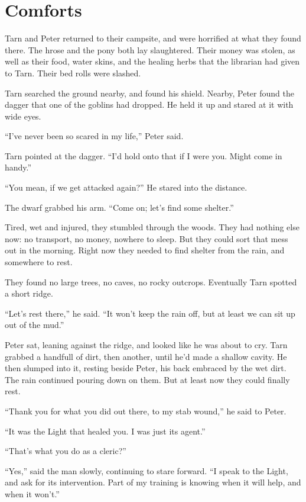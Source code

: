 \chapter{Comforts}

Tarn and Peter returned to their campsite, and were horrified at what they found there.  The hrose and the pony both lay slaughtered.  Their money was stolen, as well as their food, water skins, and the healing herbs that the librarian had given to Tarn.  Their bed rolls were slashed.

Tarn searched the ground nearby, and found his shield.  Nearby, Peter found the dagger that one of the goblins had dropped.  He held it up and stared at it with wide eyes.

``I've never been so scared in my life,'' Peter said.

Tarn pointed at the dagger.  ``I'd hold onto that if I were you.  Might come in handy.''

``You mean, if we get attacked again?''  He stared into the distance.

The dwarf grabbed his arm.  ``Come on; let's find some shelter.''

Tired, wet and injured, they stumbled through the woods.  They had nothing else now: no transport, no money, nowhere to sleep.  But they could sort that mess out in the morning.  Right now they needed to find shelter from the rain, and somewhere to rest.

They found no large trees, no caves, no rocky outcrops.  Eventually Tarn spotted a short ridge.

``Let's rest there,'' he said.  ``It won't keep the rain off, but at least we can sit up out of the mud.''

Peter sat, leaning against the ridge, and looked like he was about to cry.  Tarn grabbed a handfull of dirt, then another, until he'd made a shallow cavity.  He then slumped into it, resting beside Peter, his back embraced by the wet dirt.  The rain continued pouring down on them.  But at least now they could finally rest.

``Thank you for what you did out there, to my stab wound,'' he said to Peter.

``It was the Light that healed you.  I was just its agent.''

``That's what you do as a cleric?''

``Yes,'' said the man slowly, continuing to stare forward.  ``I speak to the Light, and ask for its intervention.  Part of my training is knowing when it will help, and when it won't.''

